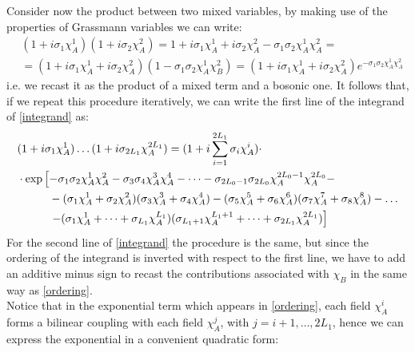 Consider now the product between two mixed variables, by making use of the properties of Grassmann variables we can write:
\begin{equation}
\begin{split}
        & (1 + i\sigma_1 \chi_A^1) (1 + i\sigma_2 \chi_A^2) = 1 + i\sigma_1 \chi_A^1 + i \sigma_2 \chi^2_A - \sigma_1\sigma_2 \chi_A^1 \chi_A^2 = \\
     & = (1 + i\sigma_1 \chi_A^1 + i\sigma_2\chi_A^2)(1 - \sigma_1 \sigma_2 \chi_A^1 \chi_B^2) = (1 + i\sigma_1 \chi_A^1 + i \sigma_2 \chi_A^2) e^{-\sigma_1 \sigma_2 \chi_A^1 \chi_A^2}
\end{split}
\end{equation}
i.e. we recast it as the product of a mixed term and a bosonic one. It follows that, if we repeat this procedure iteratively, we can write the first line of the integrand of \eqref{integrand} as:
\begin{equation}\label{ordering}
    \begin{split}
        & (1 + i \sigma_1 \chi_A^1) \dots (1 + i \sigma_{2L_1} \chi_A^{2L_1}) = (1 + i \sum_{i = 1}^{2L_1} \sigma_i \chi_A^i) \cdot \\
        & \cdot \exp \left[-\sigma_1 \sigma_2 \chi_A^1 \chi_A^2 - \sigma_3 \sigma_4 \chi_A^3 \chi_A^4 - \dots - \sigma_{2L_0 - 1} \sigma_{2L_0} \chi_A^{2L_0 - 1} \chi_A^{2L_0} - \right.\\ 
        & \hspace{10 mm} -(\sigma_1 \chi_A^1 + \sigma_2 \chi_A^2) (\sigma_3 \chi_A^3 + \sigma_4 \chi_A^4) - (\sigma_5 \chi_A^5 + \sigma_6 \chi_A^6) (\sigma_7 \chi_A^7 + \sigma_8 \chi_A^8) - \dots \\
         & \left. \hspace{10 mm} - (\sigma_1 \chi_A^1 + \dots + \sigma_{L_1}\chi_A^{L_1})(\sigma_{L_1 +1}\chi_A^{L_1 + 1} + \dots + \sigma_{2L_1}\chi_A^{2L_1}) \right]
    \end{split}
\end{equation}
For the second line of \eqref{integrand} the procedure is the same, but since the ordering of the integrand is inverted with respect to the first line, we have to add an additive minus sign to recast the contributions associated with $\chi_B$ in the same way as \eqref{ordering}.
\\ Notice that in the exponential term which appears in \eqref{ordering}, each field $\chi_A^i$ forms a bilinear coupling with each field $\chi_A^j$, with $j = i+1, \dots, 2L_1$, hence we can express the exponential in a convenient quadratic form:
